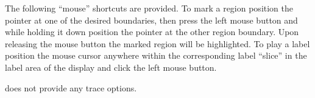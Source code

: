 The following ``mouse'' shortcuts are provided. To mark a region position the pointer at
one of the desired boundaries, then press the left mouse button and while holding it down
position the pointer at the other region boundary. Upon releasing the mouse button the 
marked region will be highlighted. To play a label position the mouse cursor anywhere within
the corresponding label ``slice'' in the label area of the display and click the left
mouse button.

 does not provide any trace options.


